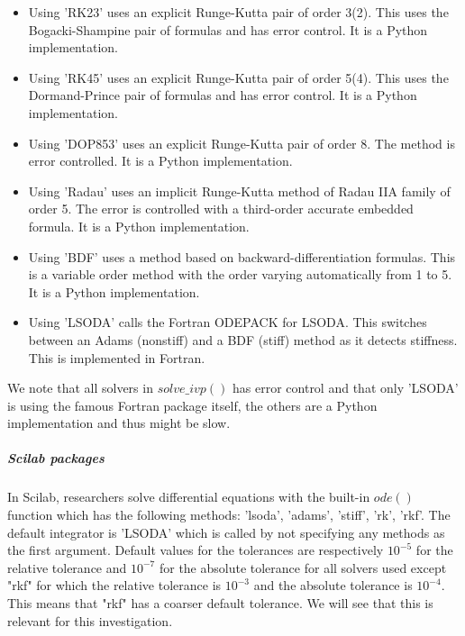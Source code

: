 \begin{itemize}
\item Using 'RK23' uses an explicit Runge-Kutta pair of order 3(2). This uses the Bogacki-Shampine pair of formulas and has error control. It is a Python implementation.
\item Using 'RK45' uses an explicit Runge-Kutta pair of order 5(4). This uses the Dormand-Prince pair of formulas and has error control. It is a Python implementation.
\item Using 'DOP853' uses an explicit Runge-Kutta pair of order 8. The method is error controlled. It is a Python implementation.
\item Using 'Radau' uses an implicit Runge-Kutta method of Radau IIA family of order 5.  The error is controlled with a third-order accurate embedded formula. It is a Python implementation.
\item Using 'BDF' uses a method based on backward-differentiation formulas. This is a variable order method with the order varying automatically from 1 to 5. It is a Python implementation.
\item Using 'LSODA' calls the Fortran ODEPACK for LSODA. This switches between an Adams (nonstiff) and a BDF (stiff) method as it detects stiffness. This is implemented in Fortran.
\end{itemize}

We note that all solvers in $solve\_ivp()$ has error control and that only 'LSODA' is using the famous Fortran package itself, the others are a Python implementation and thus might be slow.

\subparagraph{Scilab packages}
In Scilab, researchers solve differential equations with the built-in $ode()$ function which has the following methods: 'lsoda', 'adams', 'stiff', 'rk', 'rkf'. The default integrator is 'LSODA' which is called by not specifying any methods as the first argument.
Default values for the tolerances are respectively $10^{-5}$ for the relative tolerance and $10^{-7}$ for the absolute tolerance for all solvers used except "rkf" for which the relative tolerance is $10^{-3}$ and the absolute tolerance is $10^{-4}$.
This means that "rkf" has a coarser default tolerance. We will see that this is relevant for this investigation.

